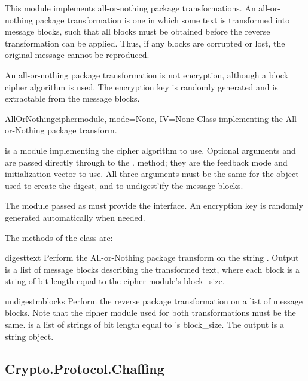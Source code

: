 \documentclass{howto}
\begin{document}
This module implements all-or-nothing package transformations.
An all-or-nothing package transformation is one in which some text is
transformed into message blocks, such that all blocks must be obtained before
the reverse transformation can be applied.  Thus, if any blocks are corrupted
or lost, the original message cannot be reproduced.

An all-or-nothing package transformation is not encryption, although a block
cipher algorithm is used.  The encryption key is randomly generated and is
extractable from the message blocks.

\begin{classdesc}{AllOrNothing}{ciphermodule, mode=None, IV=None}
Class implementing the All-or-Nothing package transform.

 is a module implementing the cipher algorithm to
use.  Optional arguments  and  are passed directly
through to the . method; they are the
feedback mode and initialization vector to use.  All three arguments
must be the same for the object used to create the digest, and to
undigest'ify the message blocks.

The module passed as  must provide the 
interface.  An encryption key is randomly generated automatically when
needed.
\end{classdesc}

The methods of the  class are:

\begin{methoddesc}{digest}{text}
Perform the All-or-Nothing package transform on the
string .  Output is a list of message blocks describing the
transformed text, where each block is a string of bit length equal
to the cipher module's block_size.
\end{methoddesc}

\begin{methoddesc}{undigest}{mblocks}
Perform the reverse package transformation on a list of message
blocks.  Note that the cipher module used for both transformations
must be the same.   is a list of strings of bit length
equal to 's block_size.  The output is a string object.
\end{methoddesc}


\subsection{Crypto.Protocol.Chaffing}
\end{document}
